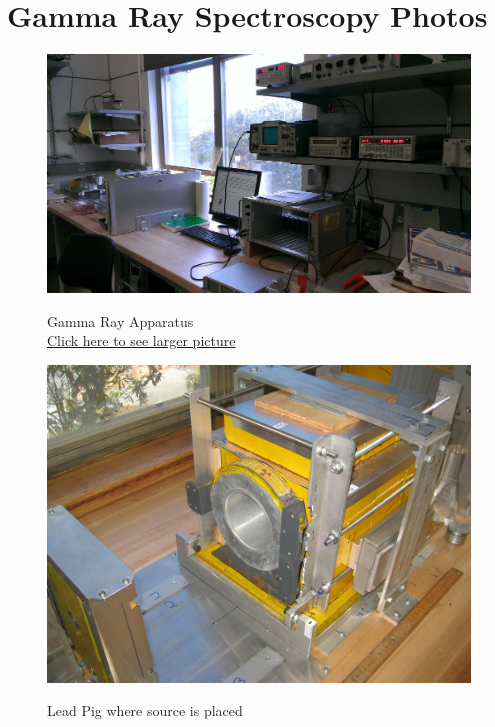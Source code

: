 \documentclass{../lab}
\begin{document}
\section{Gamma Ray Spectroscopy Photos}
\begin{figure}[H]
\captionsetup{justification=centering}
  \href{http://experimentationlab.berkeley.edu/sites/default/files/images/Gma_t1.jpg}{\includegraphics[width=\linewidth,keepaspectratio]{images/Gma_t1.jpg}}
  \caption{Gamma Ray Apparatus \\ \href{http://experimentationlab.berkeley.edu/sites/default/files/images/Gma_t1.jpg}{Click here to see larger picture}}
  \label{fig:Apparatus}
\endminipage\hfill
{}
  \href{http://experimentationlab.berkeley.edu/sites/default/files/images/GMA_Pig_3536-Lg.jpg}{\includegraphics[width=\linewidth,keepaspectratio]{images/GMA_Pig_3536-Lg.jpg}}
  \caption{Lead Pig where source is placed \\
}
\end{figure}
\end{document}
